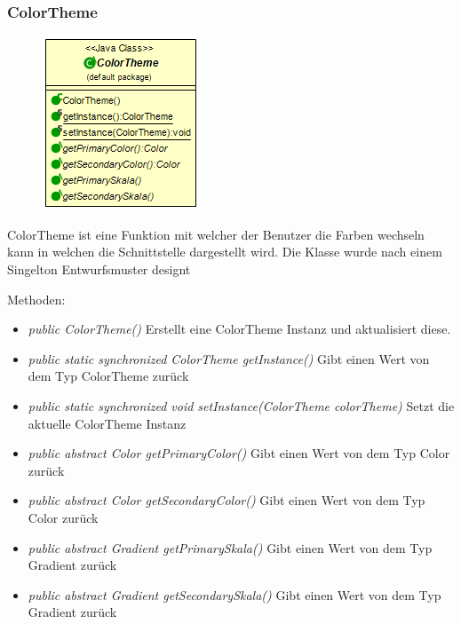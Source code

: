 \subsubsection{ColorTheme}
\begin{minipage}{0.3\textwidth}
    \begin{figure}[H]
        {\centering\includegraphics[scale = 0.5
        ]{media/view/theme/ColorTheme_Class.png}}
    \end{figure}
    \end{minipage} \hfill
    \begin{minipage}{0.6\textwidth}

ColorTheme ist eine Funktion mit welcher der Benutzer die Farben wechseln kann in welchen die Schnittstelle dargestellt wird. Die Klasse wurde nach einem Singelton Entwurfsmuster designt
\end{minipage}
Methoden: \begin{itemize} [noitemsep]
    \item \emph{public ColorTheme()} Erstellt eine ColorTheme Instanz und aktualisiert diese.
    \item \emph{public static synchronized ColorTheme getInstance()} Gibt einen Wert von dem Typ ColorTheme zurück
    \item \emph{public static synchronized void setInstance(ColorTheme colorTheme)} Setzt die aktuelle ColorTheme Instanz
    \item \emph{public abstract Color getPrimaryColor()} Gibt einen Wert von dem Typ Color zurück
    \item \emph{public abstract Color getSecondaryColor()} Gibt einen Wert von dem Typ Color zurück
    \item \emph{public abstract Gradient getPrimarySkala()} Gibt einen Wert von dem Typ Gradient zurück
    \item \emph{public abstract Gradient getSecondarySkala()}  Gibt einen Wert von dem Typ Gradient zurück
\end{itemize}

